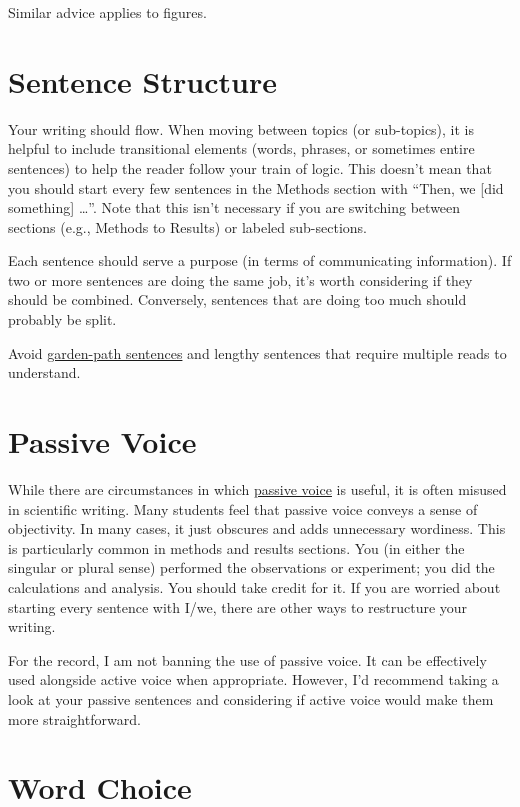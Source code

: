 \documentclass[]{book}
\begin{document}
Similar advice applies to figures.

\section{Sentence Structure}\label{sentence-structure}

Your writing should flow. When moving between topics (or sub-topics), it
is helpful to include transitional elements (words, phrases, or
sometimes entire sentences) to help the reader follow your train of
logic. This doesn't mean that you should start every few sentences in
the Methods section with ``Then, we {[}did something{]} \ldots{}''. Note
that this isn't necessary if you are switching between sections (e.g.,
Methods to Results) or labeled sub-sections.

Each sentence should serve a purpose (in terms of communicating
information). If two or more sentences are doing the same job, it's
worth considering if they should be combined. Conversely, sentences that
are doing too much should probably be split.

Avoid
\href{https://en.wikipedia.org/wiki/Garden-path_sentence}{garden-path
sentences} and lengthy sentences that require multiple reads to
understand.

\section{Passive Voice}\label{passive-voice}

While there are circumstances in which
\href{https://www.quickanddirtytips.com/education/grammar/active-voice-versus-passive-voice}{passive
voice} is useful, it is often misused in scientific writing. Many
students feel that passive voice conveys a sense of objectivity. In many
cases, it just obscures and adds unnecessary wordiness. This is
particularly common in methods and results sections. You (in either the
singular or plural sense) performed the observations or experiment; you
did the calculations and analysis. You should take credit for it. If you
are worried about starting every sentence with I/we, there are other
ways to restructure your writing.

For the record, I am not banning the use of passive voice. It can be
effectively used alongside active voice when appropriate. However, I'd
recommend taking a look at your passive sentences and considering if
active voice would make them more straightforward.

\section{Word Choice}\label{word-choice}
\end{document}
